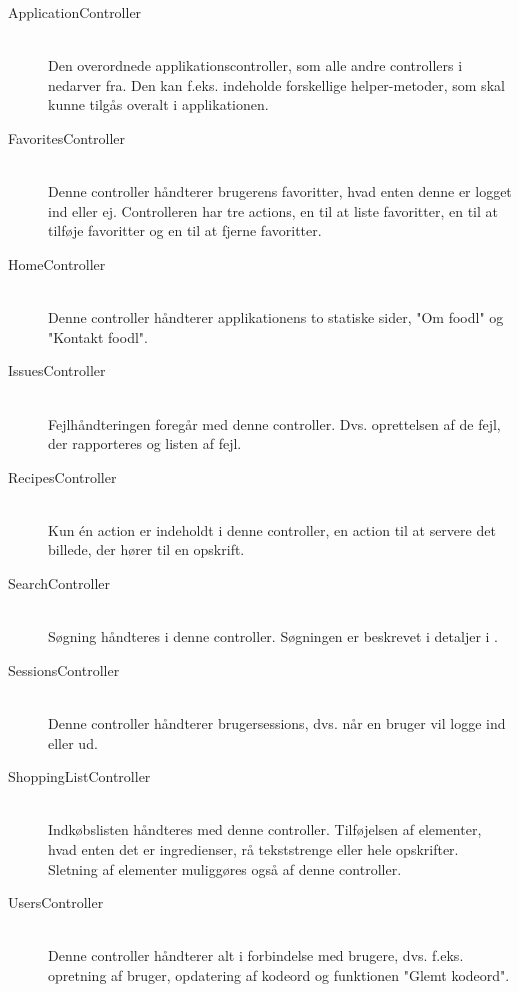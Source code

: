 \begin{description}
  \item[ApplicationController] \hfill \\ 
  Den overordnede applikationscontroller, som alle andre controllers i \Foodl{} nedarver fra. Den kan f.eks. indeholde forskellige helper-metoder, som skal kunne tilgås overalt i applikationen.

  \item[FavoritesController] \hfill \\ 
  Denne controller håndterer brugerens favoritter, hvad enten denne er logget ind eller ej. Controlleren har tre actions, en til at liste favoritter, en til at tilføje favoritter og en til at fjerne favoritter.

  \item[HomeController] \hfill \\ 
  Denne controller håndterer applikationens to statiske sider, "Om foodl" og "Kontakt foodl".

  \item[IssuesController] \hfill \\ 
  Fejlhåndteringen foregår med denne controller. Dvs. oprettelsen af de fejl, der rapporteres og listen af fejl.

  \item[RecipesController] \hfill \\
  Kun én action er indeholdt i denne controller, en action til at servere det billede, der hører til en opskrift.

  \item[SearchController] \hfill \\
  Søgning håndteres i denne controller. Søgningen er beskrevet i detaljer i .

  \item[SessionsController] \hfill \\
  Denne controller håndterer brugersessions, dvs. når en bruger vil logge ind eller ud.

  \item[ShoppingListController] \hfill \\
  Indkøbslisten håndteres med denne controller. Tilføjelsen af elementer, hvad enten det er ingredienser, rå tekststrenge eller hele opskrifter. Sletning af elementer muliggøres også af denne controller.

  \item[UsersController] \hfill \\
  Denne controller håndterer alt i forbindelse med brugere, dvs. f.eks. opretning af bruger, opdatering af kodeord og funktionen "Glemt kodeord".

\end{description}

